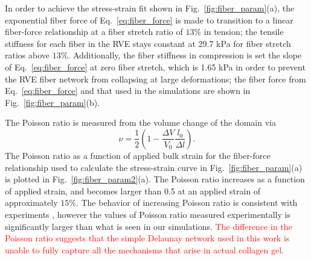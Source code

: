 \documentclass[10pt]{asme2ej}
\begin{document}
In order to achieve the stress-strain fit shown in Fig.\ \ref{fig:fiber_param}(a), the exponential fiber force of Eq.\ \eqref{eq:fiber_force} is made to transition to a linear fiber-force relationship at a fiber stretch ratio of $13\%$ in tension;  the tensile stiffness for each fiber in the RVE stays constant at 29.7 kPa for fiber stretch ratios above $13\%$. Additionally, the fiber stiffness in compression is set the slope of Eq.\ \eqref{eq:fiber_force} at zero fiber stretch, which is 1.65 kPa in order to prevent the RVE fiber network from collapsing at large deformations; the fiber force from Eq.\ \eqref{eq:fiber_force} and that used in the simulations are shown in Fig.\ \ref{fig:fiber_param}(b).

The Poisson ratio is measured from the volume change of the domain via
%
\begin{equation}
\nu = \frac{1}{2}\left(1- \frac{\Delta V}{V_0}\frac{l_0}{\Delta l}\right).
\label{eq:poisson-ratio}
\end{equation}
%
The Poisson ratio as a function of applied bulk strain for the fiber-force relationship used to calculate the stress-strain curve in Fig.\ \ref{fig:fiber_param}(a) is plotted in Fig.\ \ref{fig:fiber_param2}(a). The Poisson ratio increases as a function of applied strain, and becomes larger than 0.5 at an applied strain of approximately $15\%$. The behavior of increasing Poisson ratio is consistent with experiments \cite{Vader:2009js}, however the values of Poisson ratio measured experimentally is significantly larger than what is seen in our simulations. \textcolor{red}{The difference in the Poisson ratio suggests that the simple Delaunay network used in this work is unable to fully capture all the mechanisms that arise in actual collagen gel.}
%
\end{document}
